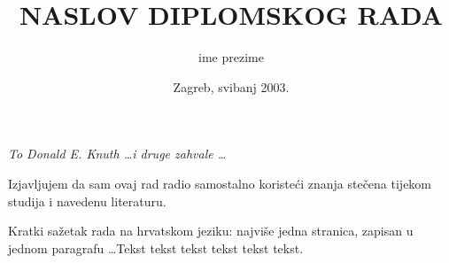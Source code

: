 \documentclass[a4paper,12pt]{report}
\title{NASLOV DIPLOMSKOG RADA}  %
\author{ime prezime}      %
\date{Zagreb, svibanj 2003.}      %
\begin{document}
%
%
\fsbkorice %
%
\fsbprvilist %
%
%
\begin{zahvala}
	\emph{To Donald E. Knuth \dots i druge zahvale \dots}
\end{zahvala}

\begin{izjava}
	Izjavljujem da sam ovaj rad radio samostalno koristeći znanja stečena
	tijekom studija i navedenu literaturu.
\end{izjava}

% 

\clearpage
\ifpdf
\fi
{}
\tableofcontents

%
\clearpage
\ifpdf
\fi
{}
\listoffigures

\clearpage
{}
\listoftables

%

\clearpage
\ifpdf
\fi
{}
\markboth{\MakeUppercase\nomname}{\MakeUppercase\nomname}
\printnomenclature

\clearpage
{}\addtocounter{brojstrana}{-1}

\begin{sazetak}
  \noindent Kratki sa\v{z}etak rada na hrvatskom jeziku: najvi\v{s}e jedna
  stranica, zapisan u jednom paragrafu 
  \ldots Tekst tekst tekst tekst tekst tekst.
\end{sazetak}
\end{document}
